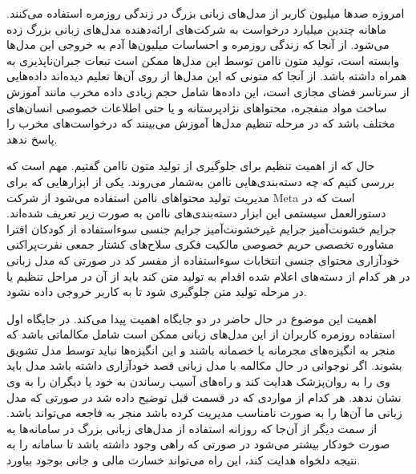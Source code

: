 

امروزه صدها میلیون کاربر از مدل‌های زبانی بزرگ در زندگی روزمره استفاده می‌کنند. ماهانه چندین میلیارد درخواست به شرکت‌های ارائه‌دهنده مدل‌های زبانی بزرگ زده می‌شود. از آنجا که زندگی روزمره و احساسات میلیون‌ها آدم به خروجی این مدل‌ها وابسته است، تولید متون ناامن توسط این مدل‌ها ممکن است تبعات جبران‌ناپذیری به همراه داشته باشد. از آنجا که متونی که این مدل‌ها از روی آن‌ها تعلیم دیده‌اند داده‌هایی از سرتاسر فضای مجازی است، این داده‌ها شامل حجم زیادی داده مخرب مانند آموزش ساخت مواد منفجره، محتواهای نژادپرستانه و یا حتی اطلاعات خصوصی انسان‌های مختلف باشد که در مرحله تنظیم مدل‌ها آموزش می‌بینند که درخواست‌های مخرب را پاسخ ندهد.


حال که از اهمیت تنظیم برای جلوگیری از تولید متون ناامن گفتیم. مهم است که بررسی کنیم که چه دسته‌بندی‌هایی ناامن به‌شمار می‌روند.
یکی از ابزار‌هایی که برای مدیریت تولید محتواهای ناامن استفاده می‌شود  از شرکت Meta است که در دستورالعمل سیستمی این ابزار دسته‌بندی‌های ناامن به صورت زیر تعریف شده‌اند.
     جرایم خشونت‌آمیز
     جرایم غیرخشونت‌آمیز
     جرایم جنسی
     سوءاستفاده از کودکان
     افترا
     مشاوره تخصصی
     حریم خصوصی
     مالکیت فکری
     سلاح‌های کشتار جمعی
     نفرت‌پراکنی
     خودآزاری
     محتوای جنسی
     انتخابات
     سوءاستفاده از مفسر کد
در صورتی که مدل زبانی در هر کدام از دسته‌های اعلام شده اقدام به تولید متن کند باید از آن در مراحل تنظیم یا در مرحله تولید متن جلوگیری شود تا به کاربر خروجی داده نشود.


اهمیت این موضوع در حال حاضر در دو جایگاه اهمیت پیدا می‌کند. در جایگاه اول استفاده روزمره کاربران از این مدل‌های زبانی ممکن است شامل مکالماتی باشد که منجر به انگیزه‌های مجرمانه یا خصمانه باشند و این انگیزه‌ها نباید توسط مدل تشویق بشوند. اگر نوجوانی در حال مکالمه با مدل زبانی قصد خودآزاری داشته باشد مدل باید وی را به روان‌پزشک هدایت کند و راه‌های آسیب رساندن به خود یا دیگران را به وی نشان ندهد. هر کدام از مواردی که در قسمت قبل توضیح داده شد در صورتی که مدل زبانی ما آن‌ها را به صورت نامناسب مدیریت کرده باشد منجر به فاجعه می‌تواند باشد. از سمت دیگر از آن‌جا که روزانه استفاده از مدل‌های زبانی بزرگ در سامانه‌ها به صورت خودکار بیشتر می‌شود در صورتی که راهی وجود داشته باشد تا سامانه را به نتیجه دلخواه هدایت کند، این راه می‌تواند خسارت مالی و جانی بوجود بیاورد.



